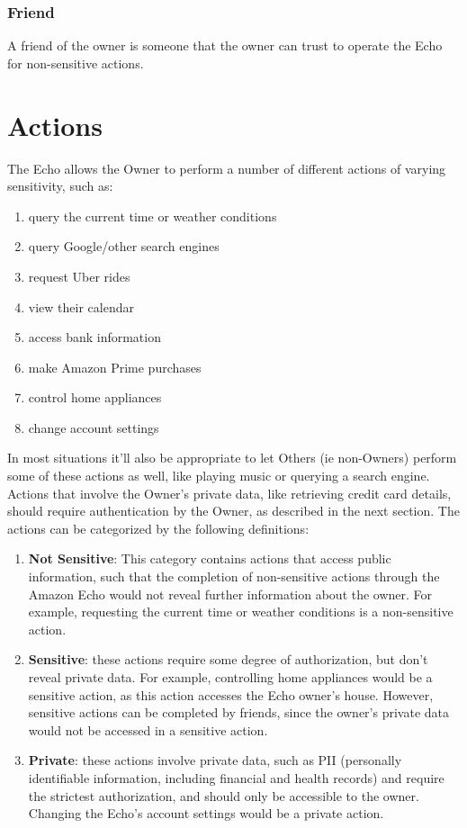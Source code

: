 \documentclass[11pt]{article}
\begin{document}
\subsubsection{Friend}
A friend of the owner is someone that the owner can trust to operate the Echo for non-sensitive actions.

\section{Actions}
The Echo allows the Owner to perform a number of different actions of varying sensitivity, such as:

\begin{enumerate}
    \item query the current time or weather conditions
    \item query Google/other search engines
    \item request Uber rides
    \item view their calendar
    \item access bank information
    \item make Amazon Prime purchases
    \item control home appliances
    \item change account settings
\end{enumerate}

In most situations it'll also be appropriate to let Others (ie non-Owners) perform some of these actions as well, like playing music or querying a search engine. Actions that involve the Owner's private data, like retrieving credit card details, should require authentication by the Owner, as described in the next section. The actions can be categorized by the following definitions:

\begin{enumerate}
    \item \textbf{Not Sensitive}: This category contains actions that access public information, such that the completion of non-sensitive actions through the Amazon Echo would not reveal further information about the owner. For example, requesting the current time or weather conditions is a non-sensitive action.
    \item \textbf{Sensitive}: these actions require some degree of authorization, but don't reveal private data. For example, controlling home appliances would be a sensitive action, as this action accesses the Echo owner's house. However, sensitive actions can be completed by friends, since the owner's private data would not be accessed in a sensitive action.
    \item \textbf{Private}: these actions involve private data, such as PII (personally identifiable information, including financial and health records) and require the strictest authorization, and should only be accessible to the owner. Changing the Echo's account settings would be a private action.
\end{enumerate}
\end{document}
